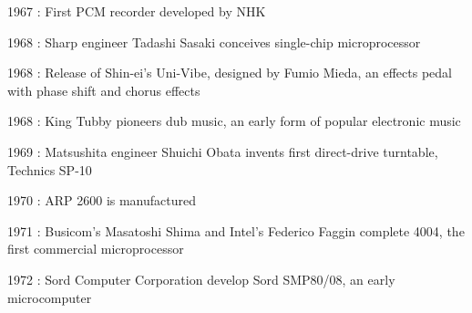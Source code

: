 \documentclass[12pt]{report}
\begin{document}
\begin{adjustwidth}{0.5in}{0.0in}
1967 : First PCM recorder developed by NHK\par

\end{adjustwidth}

\begin{adjustwidth}{0.5in}{0.0in}
1968 : Sharp engineer Tadashi Sasaki conceives single-chip microprocessor\par

\end{adjustwidth}

\begin{adjustwidth}{0.5in}{0.0in}
1968 : Release of Shin-ei's Uni-Vibe, designed by Fumio Mieda, an effects pedal with phase shift and chorus effects\par

\end{adjustwidth}

\begin{adjustwidth}{0.5in}{0.0in}
1968 : King Tubby pioneers dub music, an early form of popular electronic music\par

\end{adjustwidth}

\begin{adjustwidth}{0.5in}{0.0in}
1969 : Matsushita engineer Shuichi Obata invents first direct-drive turntable, Technics SP-10\par

\end{adjustwidth}

\begin{adjustwidth}{0.5in}{0.0in}
1970 : ARP 2600 is manufactured\par

\end{adjustwidth}

\begin{adjustwidth}{0.5in}{0.0in}
1971 : Busicom's Masatoshi Shima and Intel's Federico Faggin complete 4004, the first commercial microprocessor\par

\end{adjustwidth}

\begin{adjustwidth}{0.5in}{0.0in}
1972 : Sord Computer Corporation develop Sord SMP80/08, an early microcomputer\par

\end{adjustwidth}
\end{document}
